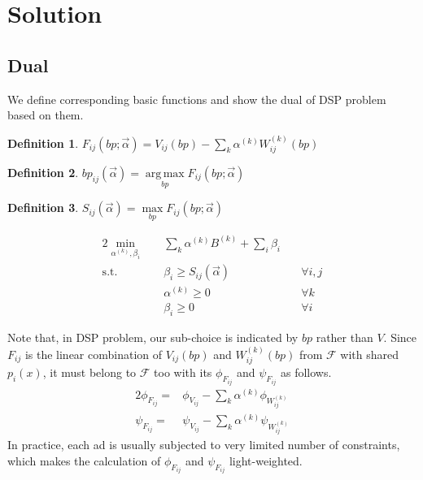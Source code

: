 \documentclass{article}
\DeclareMathOperator*{\argmax}{arg\,max}
\newtheorem{definition}{Definition}[section]
\newcommand{\sumi}{\sum\limits_i}
\newcommand{\sumk}{\sum\limits_k}
\newcommand{\sbp}{bp_{ij}}
\newcommand{\sV}{V_{ij}}
\newcommand{\sW}{W_{ij}^{(k)}}
\newcommand{\sB}{B^{(k)}}
\newcommand{\salpha}{\alpha^{(k)}}
\newcommand{\sbeta}{\beta_i}
\newcommand{\sF}{F_{ij}}
\newcommand{\sS}{S_{ij}}
\newcommand{\valpha}{\vec{\alpha}}
\newcommand{\pprob}{\phi}
\newcommand{\pcost}{\psi}
\newcommand{\uff}{\mathscr{F}}
\newcommand{\scoreconstraint}{\sbeta \ge \sS(\vec{\alpha})}
\begin{document}
\section{Solution} \label{Solution}

\subsection{Dual}

We define corresponding basic functions and show the dual of DSP problem based on them.

\begin{definition}
$\sF(bp; \valpha) = \sV(bp) - \sumk \salpha \sW(bp)$
\end{definition}

\begin{definition}
$\sbp(\valpha) = \argmax\limits_{bp} \sF(bp; \valpha)$
\end{definition}

\begin{definition}
$\sS(\valpha) = \max\limits_{bp} \sF(bp; \valpha)$
\end{definition}

\begin{alignat}{2}
    \min\limits_{\salpha, \sbeta} \quad & \sumk \salpha \sB + \sumi \sbeta \quad & {} \\
    \mbox{s.t.} \quad                   & \scoreconstraint \quad                 & \forall i,j \\
    \quad                               & \salpha \ge 0 \quad                    & \forall k \\
    \quad                               & \sbeta \ge 0 \quad                     & \forall i
\end{alignat}

Note that, in DSP problem, our sub-choice is indicated by $bp$ rather than $V$.
Since $\sF$ is the linear combination of $\sV(bp)$ and $\sW(bp)$ from $\uff$ with shared $p_i(x)$,
    it must belong to $\uff$ too with its $\pprob_{\sF}$ and $\pcost_{\sF}$ as follows.
\begin{alignat}{2}
\pprob_{\sF}= & \pprob_{\sV} - \sum\limits_k \salpha \pprob_{\sW} \\
\pcost_{\sF}= & \pcost_{\sV} - \sum\limits_k \salpha \pcost_{\sW}
\end{alignat}
In practice, each ad is usually subjected to very limited number of constraints,
    which makes the calculation of $\pprob_{\sF}$ and $\pcost_{\sF}$ light-weighted.
\end{document}
